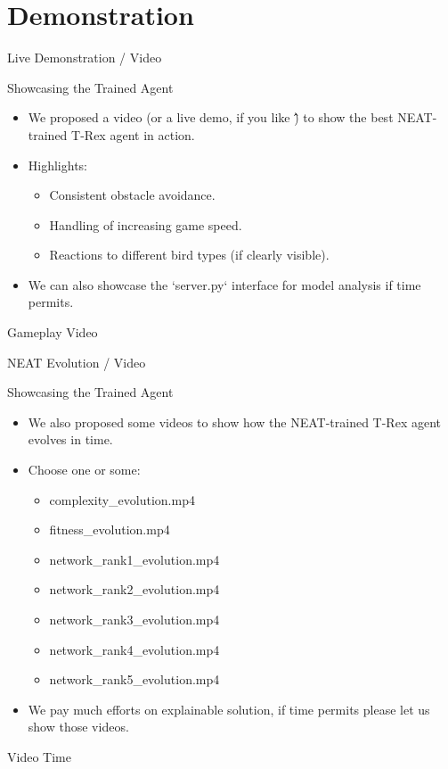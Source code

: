 \documentclass{beamer}
\begin{document}
\section{Demonstration}
\begin{frame}{Live Demonstration / Video}
  \begin{block}{Showcasing the Trained Agent}
    \begin{itemize}
        \item We proposed a video (or a live demo, if you like \^\^) to show the best NEAT-trained T-Rex agent in action.
        \item Highlights:
            \begin{itemize}
                \item Consistent obstacle avoidance.
                \item Handling of increasing game speed.
                \item Reactions to different bird types (if clearly visible).
            \end{itemize}
        \item We can also showcase the `server.py` interface for model analysis if time permits.
    \end{itemize}
  \end{block}
  \centering
  \faPlayCircle[regular] \quad \Large Gameplay Video
  \vspace{1cm}
\end{frame}

\begin{frame}{NEAT Evolution / Video}
  \begin{block}{Showcasing the Trained Agent}
    \begin{itemize}
        \item We also proposed some videos to show how the NEAT-trained T-Rex agent evolves in time.
        \item Choose one or some:
            \begin{itemize}
                \item complexity\_evolution.mp4
                \item fitness\_evolution.mp4
                \item network\_rank1\_evolution.mp4
                \item network\_rank2\_evolution.mp4
                \item network\_rank3\_evolution.mp4
                \item network\_rank4\_evolution.mp4
                \item network\_rank5\_evolution.mp4

            \end{itemize}
        \item We pay much efforts on explainable solution, if time permits please let us show those videos.
    \end{itemize}
  \end{block}
  \centering
  \faPlayCircle[regular] \quad \Large Video Time
  \vspace{1cm}
\end{frame}
\end{document}

